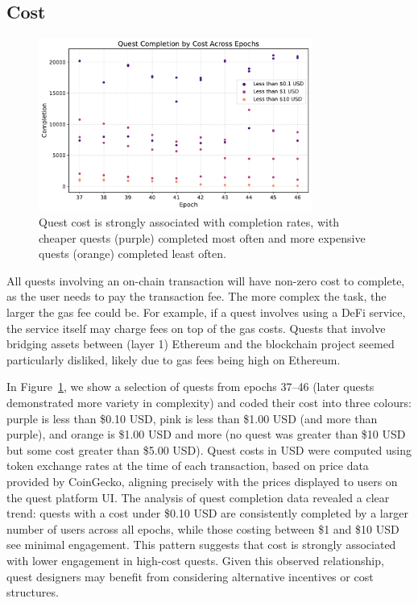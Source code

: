 
\subsection{Cost}

\begin{figure}[t]
    \centering
    \includegraphics[width=0.8\textwidth]{figures/cost.pdf}
    \caption{Quest cost is strongly associated with completion rates, with cheaper quests (purple) completed most often and more expensive quests (orange) completed least often.\label{fig:cost}}
\end{figure}

All quests involving an on-chain transaction will have non-zero cost to complete, as the user needs to pay the transaction fee. The more complex the task, the larger the gas fee could be. For example, if a quest involves using a DeFi service, the service itself may charge fees on top of the gas costs. Quests that involve bridging assets between (layer 1) Ethereum and the blockchain project seemed particularly disliked, likely due to gas fees being high on Ethereum. 

In Figure~\ref{fig:cost}, we show a selection of quests from epochs 37--46 (later quests demonstrated more variety in complexity) and coded their cost into three colours: purple is less than \$0.10 USD, pink is less than \$1.00 USD (and more than purple), and orange is \$1.00 USD and more (no quest was greater than \$10 USD but some cost greater than \$5.00 USD). Quest costs in USD were computed using token exchange rates at the time of each transaction, based on price data provided by CoinGecko, aligning precisely with the prices displayed to users on the quest platform UI. The analysis of quest completion data revealed a clear trend: quests with a cost under \$0.10 USD are consistently completed by a larger number of users across all epochs, while those costing between \$1 and \$10 USD see minimal engagement. This pattern suggests that cost is strongly associated with lower engagement in high-cost quests. Given this observed relationship, quest designers may benefit from considering alternative incentives or cost structures.

